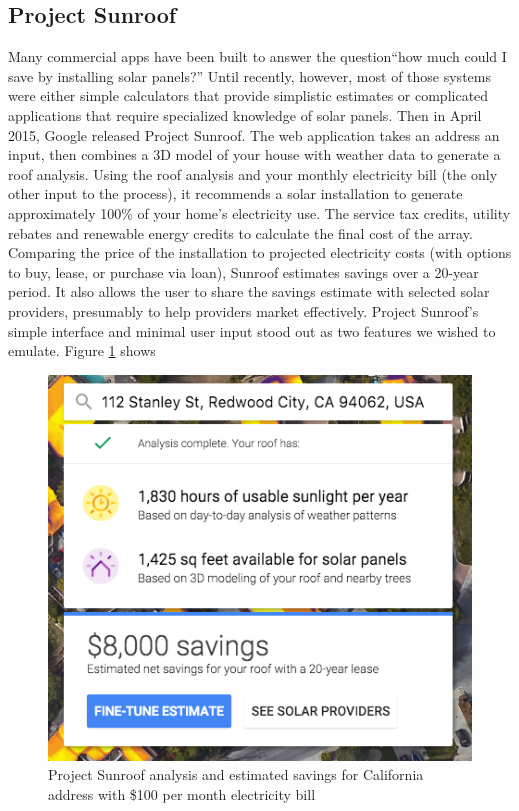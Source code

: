 \documentclass[pageno]{jpaper}
\begin{document}
\subsection{Project Sunroof}
Many commercial apps have been built to answer the question``how much could I save by installing solar panels?'' Until recently, however, most of those systems were either simple calculators that provide simplistic estimates or complicated applications that require specialized knowledge of solar panels. Then in April 2015, Google released Project Sunroof. The web application takes an address an input, then combines a 3D model of your house with weather data to generate a roof analysis. Using the roof analysis and your monthly electricity bill (the only other input to the process), it recommends a solar installation to generate approximately 100\% of your home's electricity use. The service tax credits, utility rebates and renewable energy credits to calculate the final cost of the array. Comparing the price of the installation to projected electricity costs (with options to buy, lease, or purchase via loan), Sunroof estimates savings over a 20-year period. It also allows the user to share the savings estimate with selected solar providers, presumably to help providers market effectively. Project Sunroof's simple interface and minimal user input stood out as two features we wished to emulate. Figure \ref{fig:sunroof} shows 

\begin{figure}[h]
\begin{center}
\includegraphics[scale=0.5] {sunroof}
\caption{Project Sunroof analysis and estimated savings for California address with \$100 per month electricity bill}\label{fig:sunroof}
\end{center}
\end{figure}
\end{document}
